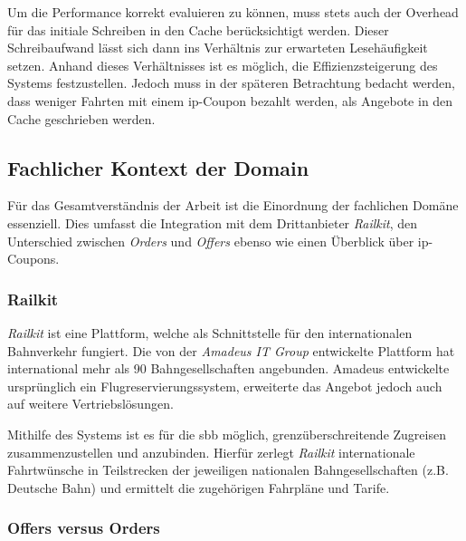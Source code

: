 Um die Performance korrekt evaluieren zu können, muss stets auch der Overhead für das initiale Schreiben in den Cache berücksichtigt werden. Dieser Schreibaufwand lässt sich dann ins Verhältnis zur erwarteten Lesehäufigkeit setzen. Anhand dieses Verhältnisses ist es möglich, die Effizienzsteigerung des Systems festzustellen. Jedoch muss in der späteren Betrachtung bedacht werden, dass weniger Fahrten mit einem \ac{ip}-Coupon bezahlt werden, als Angebote in den Cache geschrieben werden.


\subsection{Fachlicher Kontext der Domain}
\label{subsec:fachlicher_kontext}

Für das Gesamtverständnis der Arbeit ist die Einordnung der fachlichen Domäne essenziell. Dies umfasst die Integration mit dem Drittanbieter \textit{Railkit}, den Unterschied zwischen \textit{Orders} und \textit{Offers} ebenso wie einen Überblick über \ac{ip}-Coupons.


\subsubsection{Railkit}

\textit{Railkit} ist eine Plattform, welche als Schnittstelle für den internationalen Bahnverkehr fungiert. Die von der \textit{Amadeus IT Group} entwickelte Plattform hat international mehr als 90 Bahngesellschaften angebunden. Amadeus entwickelte ursprünglich ein Flugreservierungssystem, erweiterte das Angebot jedoch auch auf weitere Vertriebslösungen.


Mithilfe des Systems ist es für die \ac{sbb} möglich, grenzüberschreitende Zugreisen zusammenzustellen und anzubinden. Hierfür zerlegt \textit{Railkit} internationale Fahrtwünsche in Teilstrecken der jeweiligen nationalen Bahngesellschaften (z.B. Deutsche Bahn) und ermittelt die zugehörigen Fahrpläne und Tarife.

\subsubsection{Offers versus Orders}

